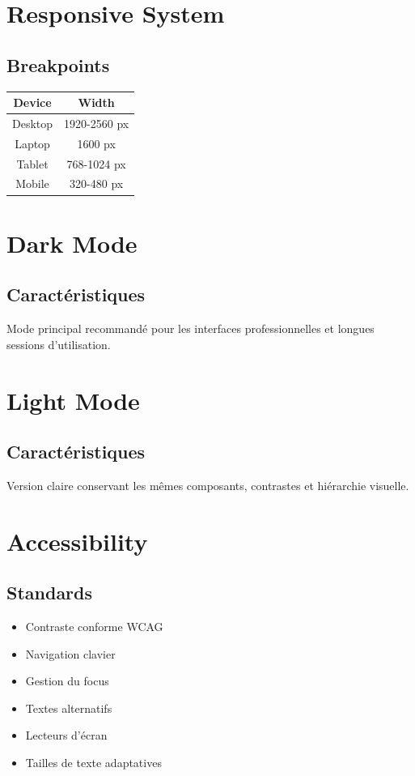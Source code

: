\documentclass[12pt,a4paper,oneside]{book}
\begin{document}
\chapter{Responsive System}

\section{Breakpoints}
\begin{center}
\begin{tabular}{|c|c|}
\hline
\rowcolor{bleuIA}
\color{white}Device & \color{white}Width \\
\hline
Desktop & 1920-2560 px \\
\hline
Laptop & 1600 px \\
\hline
Tablet & 768-1024 px \\
\hline
Mobile & 320-480 px \\
\hline
\end{tabular}
\end{center}

\chapter{Dark Mode}

\section{Caractéristiques}
Mode principal recommandé pour les interfaces professionnelles et longues sessions d'utilisation.

\chapter{Light Mode}

\section{Caractéristiques}
Version claire conservant les mêmes composants, contrastes et hiérarchie visuelle.

\chapter{Accessibility}

\section{Standards}
\begin{itemize}
\item Contraste conforme WCAG
\item Navigation clavier
\item Gestion du focus
\item Textes alternatifs
\item Lecteurs d'écran
\item Tailles de texte adaptatives
\end{itemize}
\end{document}
